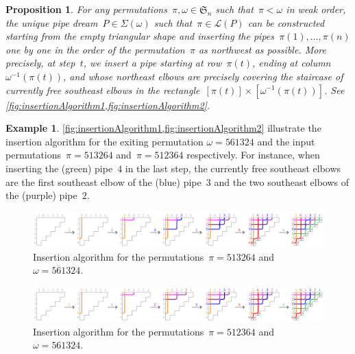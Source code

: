 \documentclass[reqno]{amsart}
\newtheorem{proposition}[theorem]{Proposition}
\theoremstyle{definition}
\newtheorem{example}[theorem]{Example}
\newcommand{\fS}{\mathfrak{S}} %
\newcommand{\acyclicPipeDreams}{\Sigma} %
\newcommand{\linearExtensions}{\mathcal{L}} %
\begin{document}
\begin{proposition}
\label{prop:insertionAlgorithm}
For any permutations~$\pi,\omega \in \fS_n$ such that~$\pi < \omega$ in weak order, the unique pipe dream~$P \in \acyclicPipeDreams(\omega)$ such that~$\pi \in \linearExtensions(P)$ can be constructed starting from the empty triangular shape and inserting the pipes~$\pi(1), \dots, \pi(n)$ one by one in the order of the permutation~$\pi$ as northwest as possible.
More precisely, at step~$t$, we insert a pipe starting at row~$\pi(t)$, ending at column~$\omega^{-1}(\pi(t))$, and whose northeast elbows are precisely covering the staircase of currently free southeast elbows in the rectangle~$[\pi(t)] \times [\omega^{-1}(\pi(t))]$.
See \cref{fig:insertionAlgorithm1,fig:insertionAlgorithm2}.
\end{proposition}

\begin{example}
\label{exm:insertionAlgorithm}
\cref{fig:insertionAlgorithm1,fig:insertionAlgorithm2} illustrate the insertion algorithm for the exiting permutation ${\omega = 561324}$ and the input permutations~${\pi = 513264}$ and~${\pi = 512364}$ respectively.
For instance, when inserting the (green) pipe~$4$ in the last step, the currently free southeast elbows are the first southeast elbow of the (blue) pipe~$3$ and the two southeast elbows of the (purple) pipe~$2$.
%
\begin{figure}[b]
	\centerline{\includegraphics[scale=.9]{insertion1}}
	\caption{Insertion algorithm for the permutations~$\pi = 513264$ and~$\omega = 561324$.}
	\label{fig:insertionAlgorithm1}
\end{figure}
%
\begin{figure}[b]
	\centerline{\includegraphics[scale=.9]{insertion2}}
	\caption{Insertion algorithm for the permutations~$\pi = 512364$ and~$\omega = 561324$.}
	\label{fig:insertionAlgorithm2}
\end{figure}
\end{example}
\end{document}
